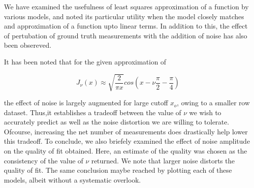 \documentclass[11pt]{article}
\begin{document}
We have examined the usefulness of least squares approximation of a
function by various models, and noted its particular utility when the
model closely matches and approximation of a function upto linear terms.
In addition to this, the effect of pertubation of ground truth
measurements with the addition of noise has also been obsereved.

It has been noted that for the given approximation of

\[ J_{\nu}(x)≈ \sqrt{\frac{2}{\pi x}} cos (x− \nu \frac{\pi}{2} −\frac{\pi}{4}) \]

the effect of noise is largely augmented for large cutoff \(x_o\), owing
to a smaller row dataset. Thus,it establishes a tradeoff between the
value of \(\nu\) we wish to accurately predict as well as the noise
distortion we are willing to tolerate. Ofcourse, increasing the net
number of measurements does drastically help lower this tradeoff. To
conclude, we also briefely examined the effect of noise amplitude on the
quality of fit obtained. Here, an estimate of the quality was chosen as
the consistency of the value of \(\nu\) returned. We note that larger
noise distorts the quality of fit. The same conclusion maybe reached by
plotting each of these models, albeit without a systematic overlook.


    
    
    
    
\end{document}
